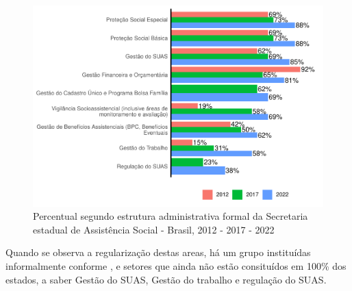 \documentclass[
  brazilian]{report}
\begin{document}
\begin{figure}
\includegraphics{Censo-SUAS-2022_files/figure-latex/uf_subd-1} \caption[Percentual segundo estrutura administrativa formal da Secretaria estadual de Assistência Social - Brasil, 2012 - 2017 - 2022]{Percentual segundo estrutura administrativa formal da Secretaria estadual de Assistência Social - Brasil, 2012 - 2017 - 2022}\label{fig:uf_subd}
\end{figure}

Quando se observa a regularização destas areas, há um grupo instituídas
informalmente conforme , e
setores que ainda não estão consituídos em 100\% dos estados, a saber
Gestão do SUAS, Gestão do trabalho e regulação do SUAS.
\end{document}
